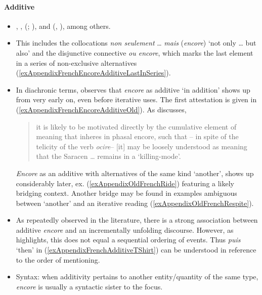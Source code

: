\paragraph{Additive}
\label{appendixFrenchEncoreAdditive}
\begin{itemize}
\item \textcite[s.v. \textit{encore}]{Dicctionnaire}, \textcite{Borillo1984}, \citeauthor{MosegaardHansen2002} (\citeyear{MosegaardHansen2002}; \citeyear[156–158, 162–168]{MosegaardHansen2008}), \textcite[104–105, 140–142]{Noelke1983} and \citeauthor{VictorriFuchs1992} (\citeyear{VictorriFuchs1992}, \citeyear{VictorriFuchs1996}), among others.
	\item This includes the collocations \textit{non seulement} … \textit{mais} (\textit{encore}) \lq not only … but also' and the disjunctive connective \textit{ou encore}, which marks the last element in a series of non-exclusive alternatives (\ref{exAppendixFrenchEncoreAdditiveLastInSeries}).
	\item In diachronic terms, \textcite[158]{MosegaardHansen2008} observes that \textit{encore} as additive \lq in addition\rq{ }shows up from very early on, even before iterative uses. The first attestation is given in (\ref{exAppendixFrenchEncoreAdditiveOld}). As \textcite[158]{MosegaardHansen2008} discusses, 
	\begin{quote}it is likely to be motivated directly by the cumulative element of meaning that inheres in phasal encore, such that – in spite of the telicity of the verb \textit{ocire}– [it] may be loosely understood as meaning that the Saracen … remains in a \lq killing-mode'. \end{quote}
\textit{Encore} as an additive with alternatives of the same kind \lq another\rq{}, shows up considerably later, ex. (\ref{exAppendixOldFrenchRide}) featuring a likely bridging context. Another bridge may be found in examples ambiguous between \lq another\rq{ }and an iterative reading (\ref{exAppendixOldFrenchRespite}). 
	\item As repeatedly observed in the literature, there is a strong association between additive \textit{encore} and an incrementally unfolding discourse. However, as \textcite[158]{MosegaardHansen2008} highlights, this does not equal a sequential ordering of events. Thus \textit{puis} \lq then\rq{ }in (\ref{exAppendixFrenchAdditiveTShirt}) can be understood in reference to the order of mentioning.
	\item Syntax: when additivity pertains to another entity/quantity of the same type, \textit{encore}	is usually a syntactic sister to the focus.
\end{itemize}
